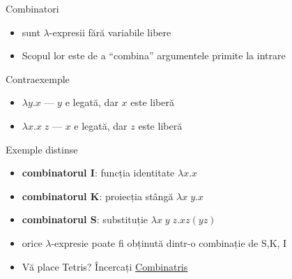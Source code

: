 \documentclass[xcolor=pdftex,romanian,colorlinks]{beamer}
\begin{document}
\begin{frame}{Combinatori}
\protect\hypertarget{combinatori}{}

\begin{itemize}

\item
   sunt \(\lambda\)-expresii fără variabile libere
\item
  Scopul lor este de a ``combina'' argumentele primite la intrare
\end{itemize}

\begin{block}{Contraexemple}

\begin{itemize}

\item
  \(\lambda y. x\) --- \(y\) e legată, dar \(x\) este liberă
\item
  \(\lambda x. x\; z\) --- \(x\) e legată, dar \(z\) este liberă
\end{itemize}

\end{block}

\begin{block}{Exemple distinse}

\begin{itemize}

\item
  \textbf{combinatorul I}: funcția identitate \(\lambda x. x\)
\item
  \textbf{combinatorul K}: proiecția stângă \(\lambda x\; y.x\)
\item
  \textbf{combinatorul S}: substituție \(\lambda x\; y\; z. x z (y z)\)
\item
  orice \(\lambda\)-expresie poate fi obținută dintr-o combinație de
  S,K, I
\item
  Vă place Tetris? Încercați
  \href{https://dirk.rave.org/combinatris/}{Combinatris}
\end{itemize}

\end{block}

\end{frame}
\end{document}
